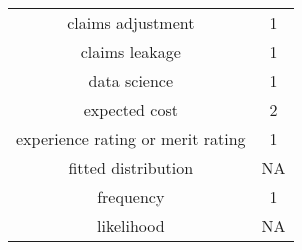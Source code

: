 \documentclass[]{book}
\theoremstyle{definition}
\theoremstyle{definition}
\theoremstyle{definition}
\theoremstyle{remark}
\begin{document}
\begin{longtable}[]{@{}cc@{}}
\begin{minipage}[t]{0.43\columnwidth}
claims adjustment\strut
\end{minipage} & \begin{minipage}[t]{0.30\columnwidth}\centering\strut
1\strut
\end{minipage}\tabularnewline
\begin{minipage}[t]{0.43\columnwidth}\centering\strut
claims leakage\strut
\end{minipage} & \begin{minipage}[t]{0.30\columnwidth}\centering\strut
1\strut
\end{minipage}\tabularnewline
\begin{minipage}[t]{0.43\columnwidth}\centering\strut
data science\strut
\end{minipage} & \begin{minipage}[t]{0.30\columnwidth}\centering\strut
1\strut
\end{minipage}\tabularnewline
\begin{minipage}[t]{0.43\columnwidth}\centering\strut
expected cost\strut
\end{minipage} & \begin{minipage}[t]{0.30\columnwidth}\centering\strut
2\strut
\end{minipage}\tabularnewline
\begin{minipage}[t]{0.43\columnwidth}\centering\strut
experience rating or merit rating\strut
\end{minipage} & \begin{minipage}[t]{0.30\columnwidth}\centering\strut
1\strut
\end{minipage}\tabularnewline
\begin{minipage}[t]{0.43\columnwidth}\centering\strut
fitted distribution\strut
\end{minipage} & \begin{minipage}[t]{0.30\columnwidth}\centering\strut
NA\strut
\end{minipage}\tabularnewline
\begin{minipage}[t]{0.43\columnwidth}\centering\strut
frequency\strut
\end{minipage} & \begin{minipage}[t]{0.30\columnwidth}\centering\strut
1\strut
\end{minipage}\tabularnewline
\begin{minipage}[t]{0.43\columnwidth}\centering\strut
likelihood\strut
\end{minipage} & \begin{minipage}[t]{0.30\columnwidth}\centering\strut
NA\strut

\end{minipage}
\end{longtable}
\end{document}

